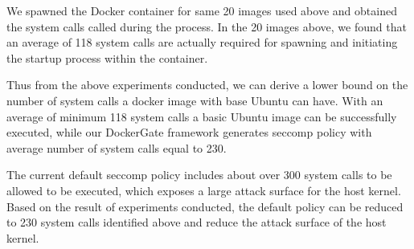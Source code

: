 We spawned the Docker container for same 20 images used above and obtained the system calls called during the process. In the 20 images above, we found that an average of 118 system calls are actually required for spawning and initiating the startup process within the container.

Thus from the above experiments conducted, we can derive a lower bound on the number of system calls a docker image with base Ubuntu can have. With an average of minimum 118 system calls a basic Ubuntu image can be  successfully executed, while our DockerGate framework generates seccomp policy with average number of system calls equal to 230. 

The current default seccomp policy includes about over 300 system calls to be allowed to be executed, which exposes a large attack surface for the host kernel. Based on the result of experiments conducted, the default policy can be reduced to 230 system calls identified above and reduce the attack surface of the host kernel. 

